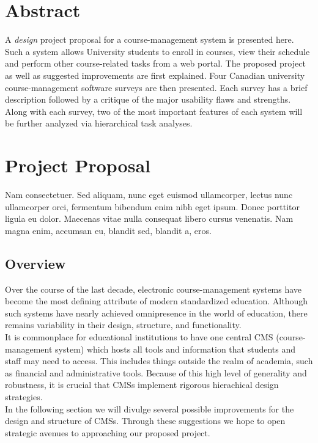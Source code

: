 \documentclass[10pt]{article}
\begin{document}
\begin{multicols}{2}

\section*{Abstract}
A \emph{design} project proposal for a course-management system is presented 
here. Such a system allows University students to enroll in courses, view their 
schedule and perform other course-related tasks from a web portal. The proposed 
project as well as suggested improvements are first explained. Four Canadian 
university course-management software surveys are then presented. Each survey 
has a brief description followed by a critique of the major usability flaws and 
strengths. Along with each survey, two of the most important features of each 
system will be further analyzed via hierarchical task analyses. 

\section*{Project Proposal}
Nam consectetuer. Sed aliquam, nunc eget euismod ullamcorper, lectus nunc 
ullamcorper orci, fermentum bibendum enim nibh eget ipsum. Donec porttitor 
ligula eu dolor. Maecenas vitae nulla consequat libero cursus venenatis. Nam 
magna enim, accumsan eu, blandit sed, blandit a, eros. 

\subsection*{Overview}
Over the course of the last decade, electronic course-management systems have become the most defining attribute of modern standardized education. Although such systems have nearly achieved omnipresence in the world of education, there remains variability in their design, structure, and functionality.\\
It is commonplace for educational institutions to have one central CMS (course-management system) which hosts all tools and information that students and staff may need to access. This includes things outside the realm of academia, such as financial and administrative tools. Because of this high level of generality and robustness, it is crucial that CMSs implement rigorous hierachical design strategies.\\
In the following section we will divulge several possible improvements for the design and structure of CMSs. Through these suggestions we hope to open strategic avenues to approaching our proposed project.\\

\end{multicols}
\end{document}
